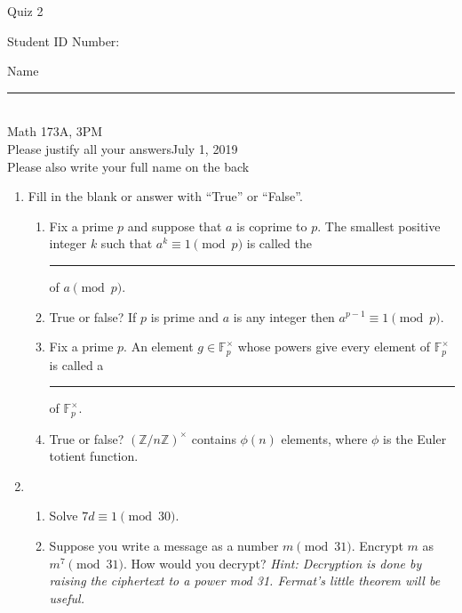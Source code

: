 \documentclass[12pt]{article}
\newcommand{\integers}{\mathbb{Z}}
\begin{document}
\begin{flushleft} 
\centerline{\LARGE{Quiz 2}} 
\vspace{5 mm}
{Student ID Number:}\hfill  
{Name \rule {2 in}{0.01in}}\\
Math 173A, 3PM
\\
{Please justify all your answers}\hfill {July 1, 2019}
\\
{Please also write your full name on the back} 

\medskip
\end{flushleft}

\begin{enumerate}
	\item Fill in the blank or answer with ``True'' or ``False''.
		\begin{enumerate}
			\item Fix a prime $p$ and suppose that $a$ is coprime to $p$. The smallest positive integer $k$ such that $a^k \equiv 1\pmod{p}$ is called the \rule{2.5cm}{.15mm} of $a \pmod{p}$.
			\item True or false? If $p$ is prime and $a$ is any integer then $a^{p-1}\equiv 1 \pmod{p}$.
			\item Fix a prime $p$. An element $g \in \mathbb{F}_p^\times$ whose powers give every element of $\mathbb{F}_p^\times$ is called a \rule{2.5cm}{.15mm} of $\mathbb{F}_p^\times$.
			\item True or false? $(\integers/n\integers)^\times$ contains $\phi(n)$ elements, where $\phi$ is the Euler totient function.
		\end{enumerate}
	\vfill
	\item 
	\begin{enumerate}
		\item Solve $7d\equiv 1\pmod{30}$.
		\vfill
		\item Suppose you write a message as a number $m\pmod{31}$. Encrypt $m$ as $m^7\pmod{31}$. How would you decrypt? \textit{Hint: Decryption is done by raising the ciphertext to a power mod 31. Fermat's little theorem will be useful.}
		\vfill
	\end{enumerate}
\end{enumerate}

\end{document}
